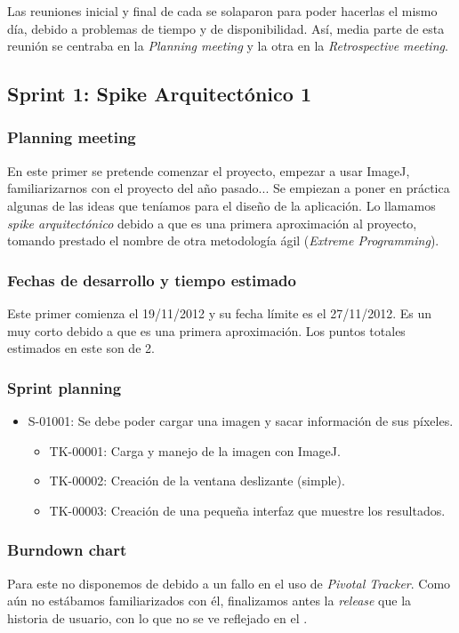 Las reuniones inicial y final de cada \sprint{} se solaparon para poder hacerlas el mismo día, debido a problemas de tiempo y de disponibilidad. Así, media parte de esta reunión se centraba en la \textit{Planning meeting} y la otra en la \textit{Retrospective meeting}.


\subsection{Sprint 1: Spike Arquitectónico 1}
\subsubsection*{Planning meeting}
En este primer \sprint{} se pretende comenzar el proyecto, empezar a usar ImageJ, familiarizarnos con el proyecto del año pasado... Se empiezan a poner en práctica algunas de las ideas que teníamos para el diseño de la aplicación. Lo llamamos \textit{spike arquitectónico} debido a que es una primera aproximación al proyecto, tomando prestado el nombre de otra metodología ágil (\textit{Extreme Programming}).

\subsubsection*{Fechas de desarrollo y tiempo estimado}
Este primer \sprint{} comienza el 19/11/2012 y su fecha límite es el 27/11/2012. Es un \sprint{} muy corto debido a que es una primera aproximación. Los puntos totales estimados en este \sprint{} son de 2.

\subsubsection*{Sprint planning}
\begin{itemize}
\item  S-01001: Se debe poder cargar una imagen y sacar información de sus píxeles.
	\begin{itemize}
	\item TK-00001: Carga y manejo de la imagen con ImageJ.
	\item TK-00002: Creación de la ventana deslizante (simple).
	\item TK-00003: Creación de una pequeña interfaz que muestre los resultados.
	\end{itemize}
\end{itemize}

\subsubsection*{Burndown chart}
Para este \sprint{} no disponemos de \burndownchart{} debido a un fallo en el uso de \textit{Pivotal Tracker}. Como aún no estábamos familiarizados con él, finalizamos antes la \textit{release} que la historia de usuario, con lo que no se ve reflejado en el \burndownchart{}.

